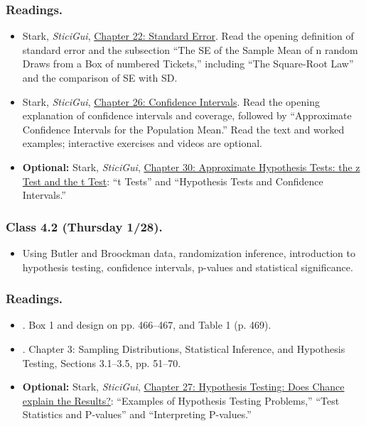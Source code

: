 \documentclass[letterpaper, 12pt, parskip=full,DIV=10]{scrartcl}
\begin{document}
\subsubsection*{Readings.}
\begin{itemize}
\item Stark, \textit{SticiGui}, \href{https://www.stat.berkeley.edu/~stark/SticiGui/Text/standardError.htm}{Chapter 22: Standard Error}. Read the opening definition of standard error and the subsection ``The SE of the Sample Mean of n random Draws from a Box of numbered Tickets,'' including ``The Square-Root Law'' and the comparison of SE with SD.
\item Stark, \textit{SticiGui}, \href{https://www.stat.berkeley.edu/~stark/SticiGui/Text/confidenceIntervals.htm}{Chapter 26: Confidence Intervals}. Read the opening explanation of confidence intervals and coverage, followed by ``Approximate Confidence Intervals for the Population Mean.'' Read the text and worked examples; interactive exercises and videos are optional.
\item \textbf{Optional:} Stark, \textit{SticiGui}, \href{https://www.stat.berkeley.edu/~stark/SticiGui/Text/zTest.htm}{Chapter 30: Approximate Hypothesis Tests: the z Test and the t Test}: ``t Tests'' and ``Hypothesis Tests and Confidence Intervals.''
\end{itemize}

\subsubsection*{Class 4.2 (Thursday 1/28).}
\begin{itemize}
\item Using Butler and Broockman data, randomization inference, introduction to hypothesis testing, confidence intervals, p-values and statistical significance.
\end{itemize}

\subsubsection*{Readings.}
\begin{itemize}
\item {}. Box 1 and design on pp. 466--467, and Table 1 (p. 469).
\item {}. Chapter 3: Sampling Distributions, Statistical Inference, and Hypothesis Testing, Sections 3.1--3.5, pp. 51--70.
\item \textbf{Optional:} Stark, \textit{SticiGui}, \href{https://www.stat.berkeley.edu/~stark/SticiGui/Text/testing.htm}{Chapter 27: Hypothesis Testing: Does Chance explain the Results?}: ``Examples of Hypothesis Testing Problems,'' ``Test Statistics and P-values'' and ``Interpreting P-values.''
\end{itemize}
\end{document}
